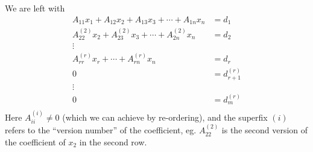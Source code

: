 \documentclass[a4paper]{article}
\begin{document}
We are left with
\begin{align*}
  A_{11}x_1 + A_{12}x_2 + A_{13}x_3 + \cdots + A_{1n}x_n &= d_1\\
  A_{22}^{(2)}x_2 + A_{23}^{(2)}x_3 + \cdots + A_{2n}^{(2)}x_n &= d_2\\
  \vdots&\\
  A_{rr}^{(r)}x_r + \cdots + A_{rn}^{(r)}x_n &= d_r\\
  0 &= d_{r + 1}^{(r)}\\
  \vdots&\\
  0 &= d_{m}^{(r)}\\
\end{align*}
Here $A_{ii}^{(i)} \not=0$ (which we can achieve by re-ordering), and the superfix $(i)$ refers to the ``version number'' of the coefficient, eg. $A_{22}^{(2)}$ is the second version of the coefficient of $x_2$ in the second row.
\end{document}

